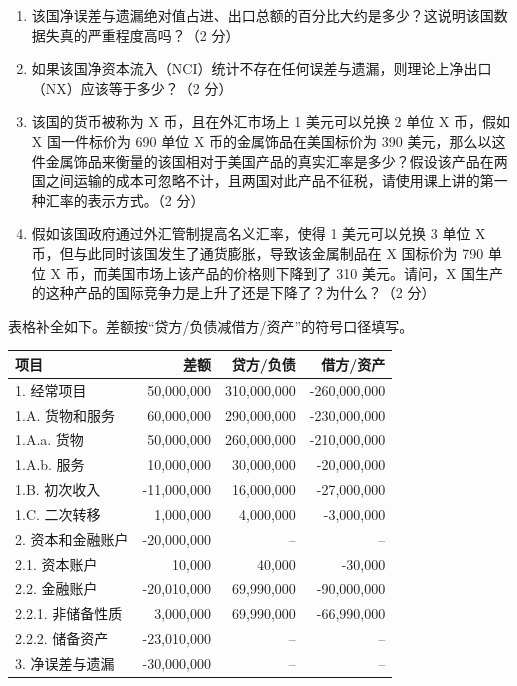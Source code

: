 \begin{question}
\begin{enumerate}[label=(\alph*),leftmargin=2.5em]
  \item 该国净误差与遗漏绝对值占进、出口总额的百分比大约是多少？这说明该国数据失真的严重程度高吗？（2 分）
  \item 如果该国净资本流入（NCI）统计不存在任何误差与遗漏，则理论上净出口（NX）应该等于多少？（2 分）
  \item 该国的货币被称为 X 币，且在外汇市场上 1 美元可以兑换 2 单位 X 币，假如 X 国一件标价为 690 单位 X 币的金属饰品在美国标价为 390 美元，那么以这件金属饰品来衡量的该国相对于美国产品的真实汇率是多少？假设该产品在两国之间运输的成本可忽略不计，且两国对此产品不征税，请使用课上讲的第一种汇率的表示方式。（2 分）
  \item 假如该国政府通过外汇管制提高名义汇率，使得 1 美元可以兑换 3 单位 X 币，但与此同时该国发生了通货膨胀，导致该金属制品在 X 国标价为 790 单位 X 币，而美国市场上该产品的价格则下降到了 310 美元。请问，X 国生产的这种产品的国际竞争力是上升了还是下降了？为什么？（2 分）
\end{enumerate}
\begin{solution}
表格补全如下。差额按“贷方/负债减借方/资产”的符号口径填写。
\begin{center}
\small
\begin{tabular}{lrrr}
\hline
项目 & 差额 & 贷方/负债 & 借方/资产\\
\hline
1. 经常项目 & 50,000,000 & 310,000,000 & -260,000,000\\
1.A. 货物和服务 & 60,000,000 & 290,000,000 & -230,000,000\\
1.A.a. 货物 & 50,000,000 & 260,000,000 & -210,000,000\\
1.A.b. 服务 & 10,000,000 & 30,000,000 & -20,000,000\\
1.B. 初次收入 & -11,000,000 & 16,000,000 & -27,000,000\\
1.C. 二次转移 & 1,000,000 & 4,000,000 & -3,000,000\\
2. 资本和金融账户 & -20,000,000 & -- & --\\
2.1. 资本账户 & 10,000 & 40,000 & -30,000\\
2.2. 金融账户 & -20,010,000 & 69,990,000 & -90,000,000\\
2.2.1. 非储备性质 & 3,000,000 & 69,990,000 & -66,990,000\\
2.2.2. 储备资产 & -23,010,000 & -- & --\\
3. 净误差与遗漏 & -30,000,000 & -- & --\\
\hline
\end{tabular}
\end{center}

\end{solution}
\end{question}

